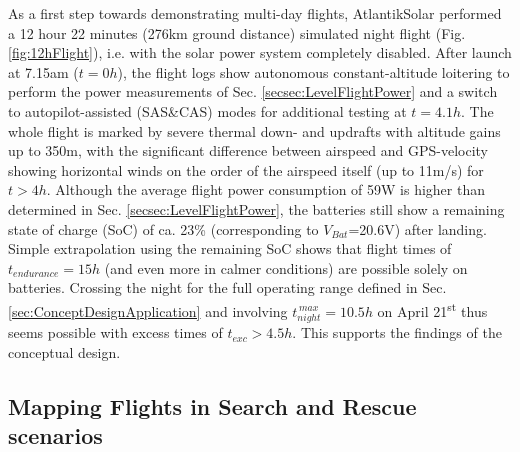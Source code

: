 As a first step towards demonstrating multi-day flights, AtlantikSolar performed a 12 hour 22 minutes (276km ground distance) simulated night flight (Fig. \ref{fig:12hFlight}), i.e. with the solar power system completely disabled. After launch at 7.15am ($t=0h$), the flight logs show autonomous constant-altitude loitering to perform the power measurements of Sec. \ref{secsec:LevelFlightPower} and a switch to autopilot-assisted (SAS\&CAS) modes for additional testing at $t=4.1h$. The whole flight is marked by severe thermal down- and updrafts with altitude gains up to 350m, with the significant difference between airspeed and GPS-velocity showing horizontal winds on the order of the airspeed itself (up to 11m/s) for $t>4h$. Although the average flight power consumption of 59W is higher than determined in Sec. \ref{secsec:LevelFlightPower}, the batteries still show a remaining state of charge (SoC) of ca. 23\% (corresponding to $V_{Bat}$=20.6V) after landing. Simple extrapolation using the remaining SoC shows that flight times of $t_{endurance}=15h$ (and even more in calmer conditions) are possible solely on batteries. Crossing the night for the full operating range defined in Sec. \ref{sec:ConceptDesignApplication} and involving $t_{night}^{\,max}=10.5h$ on April 21\textsuperscript{st} thus seems possible with excess times of $t_{exc}>4.5h$. This supports the findings of the conceptual design. 

\subsection{Mapping Flights in Search and Rescue scenarios}


